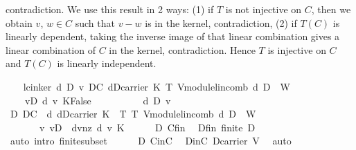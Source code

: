 \begin{isabellebody}
\begin{isamarkuptxt}
contradiction. We use this result in 2 ways: (1) if $T$ is not injective on $C$, then we obtain $v$, $w\in C$ 
such that $v-w$ is in the kernel, contradiction, (2) if $T(C)$ is linearly dependent, 
taking the inverse image of that linear combination gives a linear combination of $C$ in the kernel, 
contradiction. Hence $T$ is injective on $C$ and $T(C)$ is linearly independent.%
\end{isamarkuptxt}%
\isamarkuptrue%
\ \ \isamarkupfalse%
\ lc{\isacharunderscore}in{\isacharunderscore}ker{\isacharcolon}\ {\isachardoublequoteopen}{\isasymAnd}d\ D\ v{\isachardot}\ {\isasymlbrakk}D{\isasymsubseteq}C{\isacharsemicolon}\ d{\isasymin}D{\isasymrightarrow}carrier\ K{\isacharsemicolon}\ T\ {\isacharparenleft}V{\isachardot}module{\isachardot}lincomb\ d\ D{\isacharparenright}\ {\isacharequal}\ {\isasymzero}\isactrlbsub W\isactrlesub {\isacharsemicolon}\ \isanewline
\ \ \ \ v{\isasymin}D{\isacharsemicolon}\ d\ v\ {\isasymnoteq}{\isasymzero}\isactrlbsub K\isactrlesub {\isasymrbrakk}{\isasymLongrightarrow}False{\isachardoublequoteclose}\isanewline
\ \ \isamarkupfalse%
\ {\isacharminus}\isanewline
\ \ \ \ \isamarkupfalse%
\ d\ D\ v\isanewline
\ \ \ \ \isamarkupfalse%
\ D{\isacharcolon}\ {\isachardoublequoteopen}D{\isasymsubseteq}C{\isachardoublequoteclose}\ \ d{\isacharcolon}\ {\isachardoublequoteopen}d{\isasymin}D{\isasymrightarrow}carrier\ K{\isachardoublequoteclose}\ \ T{}{\isacharcolon}\ {\isachardoublequoteopen}T\ {\isacharparenleft}V{\isachardot}module{\isachardot}lincomb\ d\ D{\isacharparenright}\ {\isacharequal}\ {\isasymzero}\isactrlbsub W\isactrlesub {\isachardoublequoteclose}\ \isanewline
\ \ \ \ \ \ \ v{\isacharcolon}\ {\isachardoublequoteopen}v{\isasymin}D{\isachardoublequoteclose}\ \ dvnz{\isacharcolon}\ {\isachardoublequoteopen}d\ v\ {\isasymnoteq}{\isasymzero}\isactrlbsub K\isactrlesub {\isachardoublequoteclose}\isanewline
\ \ \ \ \isamarkupfalse%
\ D\ Cfin\ \isamarkupfalse%
\ Dfin{\isacharcolon}\ {\isachardoublequoteopen}finite\ D{\isachardoublequoteclose}\ \ \isamarkupfalse%
\ {\isacharparenleft}auto\ intro{\isacharcolon}\ finite{\isacharunderscore}subset{\isacharparenright}\isanewline
\ \ \ \ \isamarkupfalse%
\ D\ CinC\ \isamarkupfalse%
\ DinC{\isacharcolon}\ {\isachardoublequoteopen}D{\isasymsubseteq}carrier\ V{\isachardoublequoteclose}\ \isamarkupfalse%
\ auto\isanewline
\ \ \ \ \isamarkupfalse%

\end{isabellebody}
